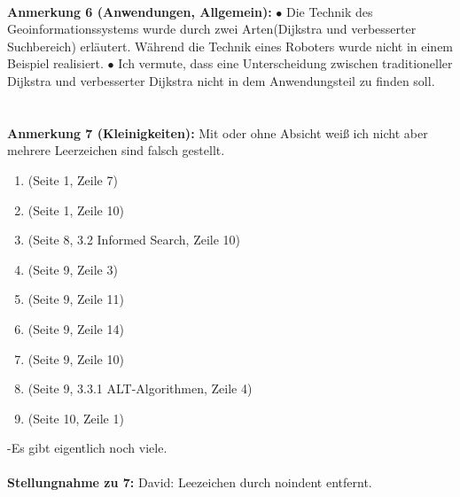 \documentclass[a4paper,12pt]{book}
\begin{document}
\\
\textbf{Anmerkung 6 (Anwendungen, Allgemein):}
\newline
$\bullet$ Die Technik des Geoinformationssystems wurde durch zwei Arten(Dijkstra und verbesserter Suchbereich) erläutert. Während die Technik eines Roboters wurde nicht in einem Beispiel realisiert.
\newline
$\bullet$ Ich vermute, dass eine Unterscheidung zwischen traditioneller Dijkstra und verbesserter Dijkstra nicht in dem Anwendungsteil zu finden soll. 
\newline 
 \\
 \\
\\
\textbf{Anmerkung 7 (Kleinigkeiten):}
Mit oder ohne Absicht weiß ich nicht aber mehrere Leerzeichen sind falsch gestellt.
\begin{enumerate}
	\item  (Seite 1, Zeile 7)
	\item  (Seite 1, Zeile 10)
	\item  (Seite 8, 3.2 Informed Search, Zeile 10)
	\item  (Seite 9, Zeile 3)
	\item  (Seite 9, Zeile 11)
	\item  (Seite 9, Zeile 14)
	\item  (Seite 9, Zeile 10)
	\item  (Seite 9, 3.3.1 ALT-Algorithmen, Zeile 4)
	\item  (Seite 10, Zeile 1)
\end{enumerate}
-Es gibt eigentlich noch viele.
\\
\\
\textbf{Stellungnahme zu 7:}
David: Leezeichen durch noindent entfernt.
\\
\end{document}
